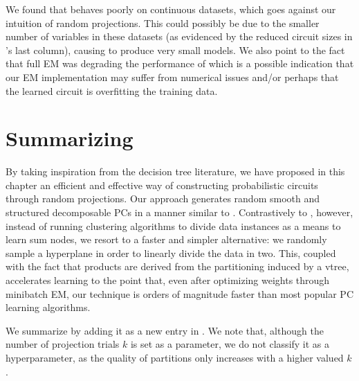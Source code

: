 We found that  behaves poorly on continuous datasets, which goes against our
intuition of random projections. This could possibly be due to the smaller number of variables in
these datasets (as evidenced by the reduced circuit sizes in 's last column),
causing  to produce very small models. We also point to the fact that full EM was
degrading the performance of  which is a possible indication that our EM
implementation may suffer from numerical issues and/or perhaps that the learned circuit is
overfitting the training data.

\section{Summarizing }

By taking inspiration from the decision tree literature, we have proposed in this chapter an
efficient and effective way of constructing probabilistic circuits through random projections. Our
approach generates random smooth and structured decomposable PCs in a manner similar to
. Contrastively to , however, instead of running clustering
algorithms to divide data instances as a means to learn sum nodes, we resort to a faster and
simpler alternative: we randomly sample a hyperplane in order to linearly divide the data in two.
This, coupled with the fact that products are derived from the partitioning induced by a vtree,
accelerates learning to the point that, even after optimizing weights through minibatch EM, our
technique is orders of magnitude faster than most popular PC learning algorithms.

We summarize  by adding it as a new entry in . We note
that, although the number of projection trials $k$ is set as a parameter, we do not classify it as
a hyperparameter, as the quality of partitions only increases with a higher valued $k$.

